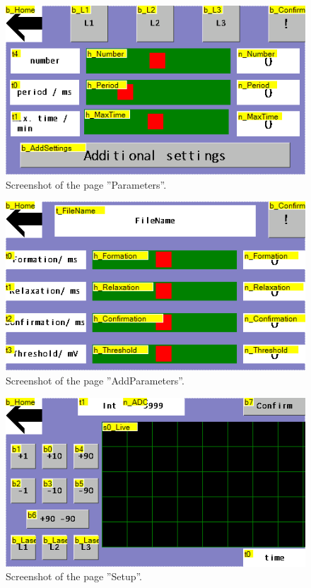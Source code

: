	\begin{figure}
		\centering
		\includegraphics[width=0.7\linewidth]{LamellaDevice_Hardware/ParametersPage}
		\caption{Screenshot of the page ''Parameters''.}
		\label{fig:parameterspage}
	\end{figure}
	
	\begin{figure}
		\centering
		\includegraphics[width=0.7\linewidth]{LamellaDevice_Hardware/AddParametersPage}
		\caption{Screenshot of the page ''AddParameters''.}
		\label{fig:addsettingpage}
	\end{figure}

	\begin{figure}
		\centering
		\includegraphics[width=0.7\linewidth]{LamellaDevice_Hardware/SetupPage}
		\caption{Screenshot of the page ''Setup''.}
		\label{fig:setuppage}
	\end{figure}
	
